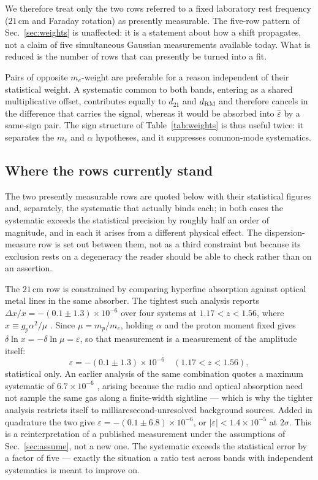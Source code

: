 \documentclass[aps,prd,twocolumn,superscriptaddress,nofootinbib,10pt]{revtex4-2}
\begin{document}
We therefore treat only the two rows referred to a fixed laboratory rest frequency ($21\,$cm and
Faraday rotation) as presently measurable. The five-row pattern of Sec.~\ref{sec:weights} is
unaffected: it is a statement about how a shift propagates, not a claim of five simultaneous
Gaussian measurements available today. What is reduced is the number of rows that can presently be
turned into a fit.

Pairs of opposite $m_e$-weight are preferable for a reason independent of their statistical
weight. A systematic common to both bands, entering as a shared multiplicative offset, contributes
equally to $d_{21}$ and $d_{\rm RM}$ and therefore cancels in the difference that carries the
signal, whereas it would be absorbed into $\hat{\varepsilon}$ by a same-sign pair. The sign
structure of Table~\ref{tab:weights} is thus useful twice: it separates the $m_e$ and $\alpha$
hypotheses, and it suppresses common-mode systematics.

\subsection{Where the rows currently stand}

The two presently measurable rows are quoted below with their statistical figures and, separately,
the systematic that actually binds each; in both cases the systematic exceeds the statistical
precision by roughly half an order of magnitude, and in each it arises from a different physical
effect. The dispersion-measure row is set out between them, not as a third constraint but because
its exclusion rests on a degeneracy the reader should be able to check rather than on an assertion.

The $21\,$cm row is constrained by comparing hyperfine absorption against optical metal lines in
the same absorber. The tightest such analysis reports $\Delta x / x = -(0.1 \pm 1.3) \times
10^{-6}$ over four systems at $1.17 < z < 1.56$, where $x \equiv g_p \alpha^{2}/\mu$
\citep{Rahmani2012}. Since $\mu = m_p/m_e$, holding $\alpha$ and the proton moment fixed gives
$\delta \ln x = -\delta \ln \mu = \varepsilon$, so that measurement is a measurement of the
amplitude itself:
%
\begin{equation}
  \varepsilon = -(0.1 \pm 1.3) \times 10^{-6} \quad (1.17 < z < 1.56),
  \label{eq:eps21}
\end{equation}
%
statistical only. An earlier analysis of the same combination
quotes a maximum systematic of $6.7 \times 10^{-6}$ \citep{Kanekar2010}, arising because the
radio and optical absorption need not sample the same gas along a finite-width sightline --- which
is why the tighter analysis restricts itself to milliarcsecond-unresolved background sources.
Added in quadrature the two give $\varepsilon = -(0.1 \pm 6.8) \times 10^{-6}$, or
$|\varepsilon| < 1.4 \times 10^{-5}$ at $2\sigma$. This is a reinterpretation of a published
measurement under the assumptions of Sec.~\ref{sec:assume}, not a new one. The systematic exceeds
the statistical error by a factor of five --- exactly the situation a ratio test across bands with
independent systematics is meant to improve on.
\end{document}
